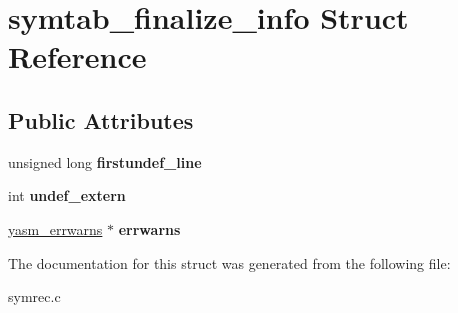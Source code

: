 \hypertarget{structsymtab__finalize__info}{\section{symtab\-\_\-finalize\-\_\-info Struct Reference}
\label{structsymtab__finalize__info}
}
\subsection*{Public Attributes}
\begin{DoxyCompactItemize}
\item 
\hypertarget{structsymtab__finalize__info_afd5ae8a4fc1e249a67735513cd82e694}{unsigned long {\bfseries firstundef\-\_\-line}}\label{structsymtab__finalize__info_afd5ae8a4fc1e249a67735513cd82e694}

\item 
\hypertarget{structsymtab__finalize__info_aecd7c7c4513c5cf56f4bc0b5305a669e}{int {\bfseries undef\-\_\-extern}}\label{structsymtab__finalize__info_aecd7c7c4513c5cf56f4bc0b5305a669e}

\item 
\hypertarget{structsymtab__finalize__info_a1f03bdfe37c58148c736ca2b41f1cf90}{\hyperlink{structyasm__errwarns}{yasm\-\_\-errwarns} $\ast$ {\bfseries errwarns}}\label{structsymtab__finalize__info_a1f03bdfe37c58148c736ca2b41f1cf90}

\end{DoxyCompactItemize}


The documentation for this struct was generated from the following file\-:\begin{DoxyCompactItemize}
\item 
symrec.\-c\end{DoxyCompactItemize}
